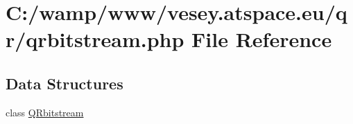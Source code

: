 \hypertarget{qrbitstream_8php}{\section{C\-:/wamp/www/vesey.atspace.\-eu/qr/qrbitstream.php File Reference}
\label{qrbitstream_8php}
}
\subsection*{Data Structures}
\begin{DoxyCompactItemize}
\item 
class \hyperlink{class_q_rbitstream}{Q\-Rbitstream}
\end{DoxyCompactItemize}
